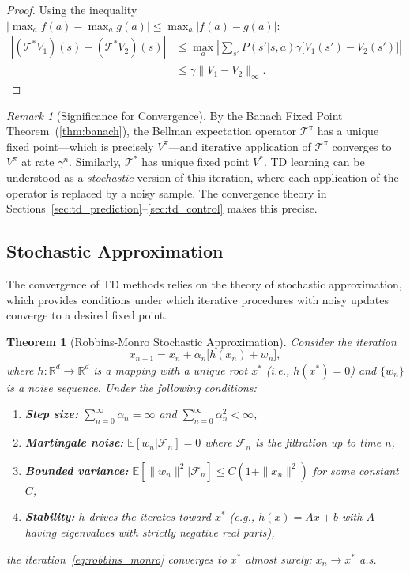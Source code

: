 \documentclass[11pt,a4paper]{article}
\theoremstyle{definition}
\theoremstyle{plain}
\newtheorem{theorem}{Theorem}[section]
\theoremstyle{remark}
\newtheorem{remark}{Remark}[section]
\newcommand{\E}{\mathbb{E}}
\newcommand{\R}{\mathbb{R}}
\begin{document}
\begin{proof}
Using the inequality $|\max_a f(a) - \max_a g(a)| \leq \max_a |f(a) - g(a)|$:
\begin{align}
    |(\mathcal{T}^* V_1)(s) - (\mathcal{T}^* V_2)(s)|
    &\leq \max_a \left|\sum_{s'} P(s'|s,a)\gamma\bigl[V_1(s') - V_2(s')\bigr]\right| \nonumber\\
    &\leq \gamma \|V_1 - V_2\|_\infty. \label{eq:bellman_opt_contraction_proof}
\end{align}
\end{proof}

\begin{remark}[Significance for Convergence]
\label{rem:contraction_significance}
By the Banach Fixed Point Theorem~(\ref{thm:banach}), the Bellman expectation operator $\mathcal{T}^\pi$ has a unique fixed point---which is precisely $V^\pi$---and iterative application of $\mathcal{T}^\pi$ converges to $V^\pi$ at rate $\gamma^n$. Similarly, $\mathcal{T}^*$ has unique fixed point $V^*$. TD learning can be understood as a \emph{stochastic} version of this iteration, where each application of the operator is replaced by a noisy sample. The convergence theory in Sections~\ref{sec:td_prediction}--\ref{sec:td_control} makes this precise.
\end{remark}

\subsection{Stochastic Approximation}
\label{subsec:stochastic_approx}

The convergence of TD methods relies on the theory of stochastic approximation, which provides conditions under which iterative procedures with noisy updates converge to a desired fixed point.

\begin{theorem}[Robbins-Monro Stochastic Approximation]
\label{thm:robbins_monro}
Consider the iteration
\begin{equation}
    x_{n+1} = x_n + \alpha_n \bigl[h(x_n) + w_n\bigr],
    \label{eq:robbins_monro}
\end{equation}
where $h: \R^d \to \R^d$ is a mapping with a unique root $x^*$ (i.e., $h(x^*) = 0$) and $\{w_n\}$ is a noise sequence. Under the following conditions:
\begin{enumerate}[nosep]
    \item \textbf{Step size:} $\sum_{n=0}^{\infty} \alpha_n = \infty$ and $\sum_{n=0}^{\infty} \alpha_n^2 < \infty$,
    \item \textbf{Martingale noise:} $\E[w_n | \mathcal{F}_n] = 0$ where $\mathcal{F}_n$ is the filtration up to time $n$,
    \item \textbf{Bounded variance:} $\E[\|w_n\|^2 | \mathcal{F}_n] \leq C(1 + \|x_n\|^2)$ for some constant $C$,
    \item \textbf{Stability:} $h$ drives the iterates toward $x^*$ (e.g., $h(x) = Ax + b$ with $A$ having eigenvalues with strictly negative real parts),
\end{enumerate}
the iteration~\eqref{eq:robbins_monro} converges to $x^*$ almost surely: $x_n \to x^*$ a.s.
\end{theorem}
\end{document}

